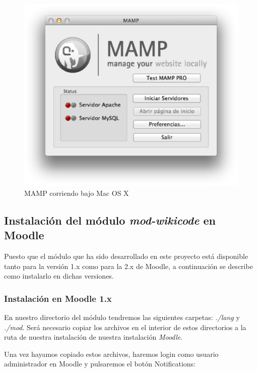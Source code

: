\begin{figure}[h]
	\label{wamp.eps}
	\includegraphics[width=\textwidth]{./img/wamp.eps}
	\caption{MAMP corriendo bajo Mac OS X}
\end{figure}

\subsection{Instalación del módulo \emph{mod-wikicode} en Moodle}

Puesto que el módulo que ha sido desarrollado en este proyecto está disponible tanto para la versión 1.x como para la 2.x de Moodle, a continuación se describe como instalarlo en dichas versiones.

\subsubsection{Instalación en Moodle 1.x}

En nuestro directorio del módulo tendremos las siguientes carpetas:  \emph{./lang} y  \emph{./mod}. Será necesario copiar los archivos en el interior de estos directorios a la ruta de nuestra instalación de nuestra instalación  \emph{Moodle}.

Una vez hayamos copiado estos archivos, haremos login como usuario administrador en Moodle y pulsaremos el botón Notifications:

\vspace{1cm}

